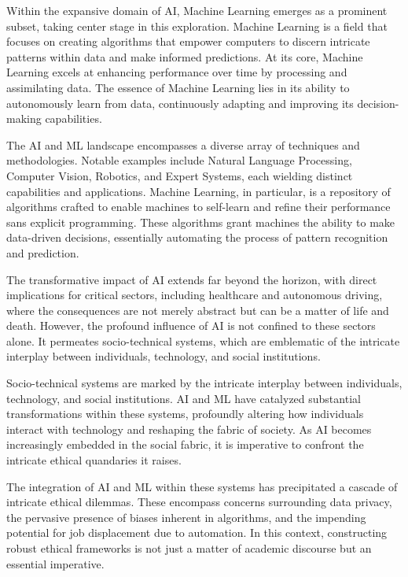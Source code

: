 \documentclass[12pt,a4paper,openright,twoside]{book}
\begin{document}
Within the expansive domain of AI, Machine Learning emerges as a prominent subset, taking center stage in this exploration. Machine Learning is a field that focuses on creating algorithms that empower computers to discern intricate patterns within data and make informed predictions. At its core, Machine Learning excels at enhancing performance over time by processing and assimilating data. The essence of Machine Learning lies in its ability to autonomously learn from data, continuously adapting and improving its decision-making capabilities. 

The AI and ML landscape encompasses a diverse array of techniques and methodologies. Notable examples include Natural Language Processing, Computer Vision, Robotics, and Expert Systems, each wielding distinct capabilities and applications. Machine Learning, in particular, is a repository of algorithms crafted to enable machines to self-learn and refine their performance sans explicit programming. These algorithms grant machines the ability to make data-driven decisions, essentially automating the process of pattern recognition and prediction. 

The transformative impact of AI extends far beyond the horizon, with direct implications for critical sectors, including healthcare and autonomous driving, where the consequences are not merely abstract but can be a matter of life and death. However, the profound influence of AI is not confined to these sectors alone. It permeates socio-technical systems, which are emblematic of the intricate interplay between individuals, technology, and social institutions. 

Socio-technical systems are marked by the intricate interplay between individuals, technology, and social institutions. AI and ML have catalyzed substantial transformations within these systems, profoundly altering how individuals interact with technology and reshaping the fabric of society. As AI becomes increasingly embedded in the social fabric, it is imperative to confront the intricate ethical quandaries it raises. 

The integration of AI and ML within these systems has precipitated a cascade of intricate ethical dilemmas. These encompass concerns surrounding data privacy, the pervasive presence of biases inherent in algorithms, and the impending potential for job displacement due to automation. In this context, constructing robust ethical frameworks is not just a matter of academic discourse but an essential imperative. 
\end{document}
